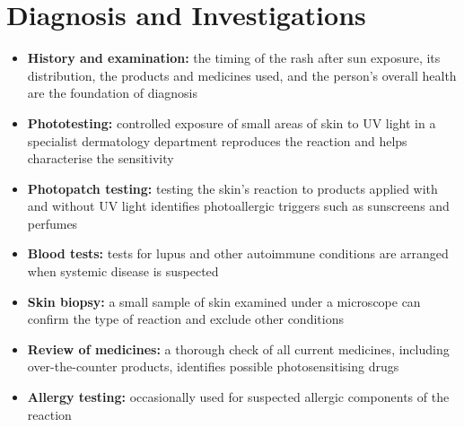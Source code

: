 \section*{Diagnosis and Investigations}
\begin{itemize}
    \item \textbf{History and examination:} the timing of the rash after sun exposure, its distribution, the products and medicines used, and the person's overall health are the foundation of diagnosis
    \item \textbf{Phototesting:} controlled exposure of small areas of skin to UV light in a specialist dermatology department reproduces the reaction and helps characterise the sensitivity
    \item \textbf{Photopatch testing:} testing the skin's reaction to products applied with and without UV light identifies photoallergic triggers such as sunscreens and perfumes
    \item \textbf{Blood tests:} tests for lupus and other autoimmune conditions are arranged when systemic disease is suspected
    \item \textbf{Skin biopsy:} a small sample of skin examined under a microscope can confirm the type of reaction and exclude other conditions
    \item \textbf{Review of medicines:} a thorough check of all current medicines, including over-the-counter products, identifies possible photosensitising drugs
    \item \textbf{Allergy testing:} occasionally used for suspected allergic components of the reaction
\end{itemize}

